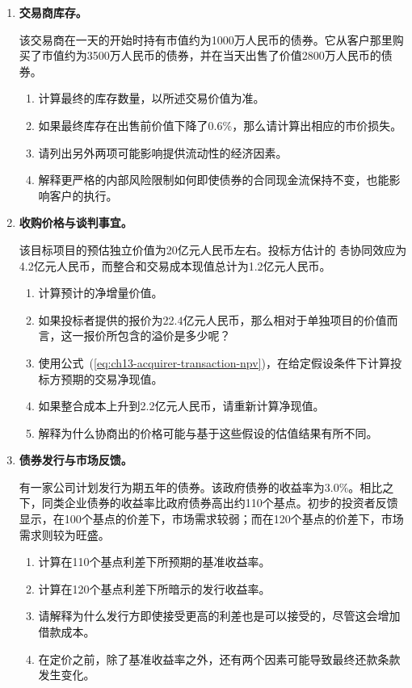 \begin{enumerate}
\item \textbf{交易商库存。}

该交易商在一天的开始时持有市值约为1000万人民币的债券。它从客户那里购买了市值约为3500万人民币的债券，并在当天出售了价值2800万人民币的债券。

\begin{enumerate}

\item 计算最终的库存数量，以所述交易价值为准。

\item 如果最终库存在出售前价值下降了0.6\%，那么请计算出相应的市价损失。

\item 请列出另外两项可能影响提供流动性的经济因素。

\item 解释更严格的内部风险限制如何即使债券的合同现金流保持不变，也能影响客户的执行。

\end{enumerate}

\item \textbf{收购价格与谈判事宜。}

该目标项目的预估独立价值为20亿元人民币左右。投标方估计的 총协同效应为4.2亿元人民币，而整合和交易成本现值总计为1.2亿元人民币。

\begin{enumerate}
\item 计算预计的净增量价值。
\item 如果投标者提供的报价为22.4亿元人民币，那么相对于单独项目的价值而言，这一报价所包含的溢价是多少呢？
\item 使用公式~(\ref{eq:ch13-acquirer-transaction-npv})，在给定假设条件下计算投标方预期的交易净现值。
\item 如果整合成本上升到2.2亿元人民币，请重新计算净现值。
\item 解释为什么协商出的价格可能与基于这些假设的估值结果有所不同。
\end{enumerate}

\item \textbf{债券发行与市场反馈。}

有一家公司计划发行为期五年的债券。该政府债券的收益率为3.0\%。相比之下，同类企业债券的收益率比政府债券高出约110个基点。初步的投资者反馈显示，在100个基点的价差下，市场需求较弱；而在120个基点的价差下，市场需求则较为旺盛。

\begin{enumerate}

\item 计算在110个基点利差下所预期的基准收益率。

\item 计算在120个基点利差下所暗示的发行收益率。

\item 请解释为什么发行方即使接受更高的利差也是可以接受的，尽管这会增加借款成本。

\item 在定价之前，除了基准收益率之外，还有两个因素可能导致最终还款条款发生变化。

\end{enumerate}

\end{enumerate}

